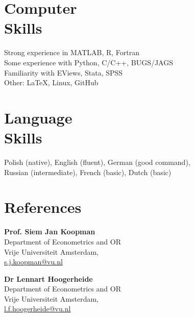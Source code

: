 \documentclass[margin,line]{resume}
\newlength\Colsep
\begin{document}
\begin{resume}


 
 	

   \section{\mysidestyle Computer\\ Skills} 
   Strong experience in MATLAB, R, Fortran   \vspace{1mm}\\
   Some experience with Python, C/C++, BUGS/JAGS \vspace{1mm}\\
	Familiarity with EViews, Stata, SPSS \vspace{1mm} \\
	Other: \LaTeX, Linux, GitHub  

   \section{\mysidestyle Language\\ Skills}  
	Polish (native), English (fluent),  German (good command),    \\
    Russian (intermediate),  French (basic),  Dutch (basic)

\newpage	     
\section{\mysidestyle References} 

\noindent
\begin{minipage}[t][6cm][t]{\dimexpr0.5\textwidth-0.5\Colsep\relax}
\textbf{Prof. Siem Jan Koopman} \\    
Department of Econometrics and OR\\
Vrije Universiteit Amsterdam, \\ \url{s.j.koopman@vu.nl}
\vspace{5mm}

\textbf{Dr Lennart Hoogerheide} \\  
Department of Econometrics and OR \\  
Vrije Universiteit Amsterdam,\\ \url{l.f.hoogerheide@vu.nl}
\vspace{5mm}


\end{minipage}
\end{resume}
\end{document}
